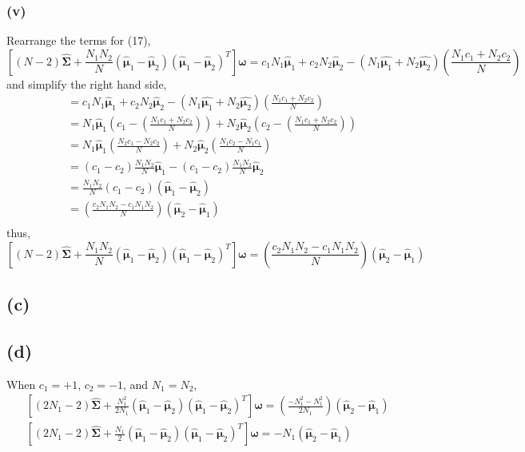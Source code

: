 \documentclass[11pt]{article}
\begin{document}
\subsubsection*{(v)}
Rearrange the terms for (17),
$$\left[(N-2)\hat{\pmb{\Sigma}} +\frac{N_1N_2}{N}\left(\hat{\pmb{\mu}}_1-\hat{\pmb{\mu}}_2\right)\left(\hat{\pmb{\mu}}_1-\hat{\pmb{\mu}}_2\right)^T\right]\pmb{\omega}=c_1N_1\hat{\pmb{\mu}}_1+c_2N_2\hat{\pmb{\mu}}_2-\left(N_1\hat{\pmb{\mu}_1}+N_2\hat{\pmb{\mu}_2}\right)\left(\frac{N_1c_1+N_2c_2}{N}\right)$$
and simplify the right hand side,
\begin{equation}
\begin{split}
&=c_1N_1\hat{\pmb{\mu}}_1+c_2N_2\hat{\pmb{\mu}}_2-\left(N_1\hat{\pmb{\mu}_1}+N_2\hat{\pmb{\mu}_2}\right)\left(\frac{N_1c_1+N_2c_2}{N}\right)\\
&=N_1\hat{\pmb{\mu}}_1\left(c_1-\left(\frac{N_1c_1+N_2c_2}{N}\right)\right)+
N_2\hat{\pmb{\mu}}_2\left(c_2-\left(\frac{N_1c_1+N_2c_2}{N}\right)\right)\\
&=N_1\hat{\pmb{\mu}}_1\left(\frac{N_2c_1-N_2c_2}{N}\right)+
N_2\hat{\pmb{\mu}}_2\left(\frac{N_1c_2-N_1c_1}{N}\right)\\
&=\left(c_1-c_2\right)\frac{N_1N_2}{N}\hat{\pmb{\mu}}_1-
\left(c_1-c_2\right)\frac{N_1N_2}{N}\hat{\pmb{\mu}}_2\\
&=\frac{N_1N_2}{N}\left(c_1-c_2\right)\left(\hat{\pmb{\mu}}_1-\hat{\pmb{\mu}}_2\right)\\
&=\left(\frac{c_2N_1N_2-c_1N_1N_2}{N}\right)\left(\hat{\pmb{\mu}}_2-\hat{\pmb{\mu}}_1\right)\\
\end{split}
\end{equation}
thus,
$$\left[(N-2)\hat{\pmb{\Sigma}} +\frac{N_1N_2}{N}\left(\hat{\pmb{\mu}}_1-\hat{\pmb{\mu}}_2\right)\left(\hat{\pmb{\mu}}_1-\hat{\pmb{\mu}}_2\right)^T\right]\pmb{\omega}=\left(\frac{c_2N_1N_2-c_1N_1N_2}{N}\right)\left(\hat{\pmb{\mu}}_2-\hat{\pmb{\mu}}_1\right)$$
\subsection*{(c)}

\subsection*{(d)}
When $c_1=+1$, $c_2=-1$, and $N_1=N_2$,
\begin{equation}
\begin{split}
\left[(2N_1-2)\hat{\pmb{\Sigma}} +\frac{N_1^2}{2N_1}\left(\hat{\pmb{\mu}}_1-\hat{\pmb{\mu}}_2\right)\left(\hat{\pmb{\mu}}_1-\hat{\pmb{\mu}}_2\right)^T\right]\pmb{\omega}=\left(\frac{-N_1^2-N_1^2}{2N_1}\right)\left(\hat{\pmb{\mu}}_2-\hat{\pmb{\mu}}_1\right)\\
\left[(2N_1-2)\hat{\pmb{\Sigma}} +\frac{N_1}{2}\left(\hat{\pmb{\mu}}_1-\hat{\pmb{\mu}}_2\right)\left(\hat{\pmb{\mu}}_1-\hat{\pmb{\mu}}_2\right)^T\right]\pmb{\omega}=-N_1\left(\hat{\pmb{\mu}}_2-\hat{\pmb{\mu}}_1\right)\\
\end{split}
\end{equation}
\end{document}
